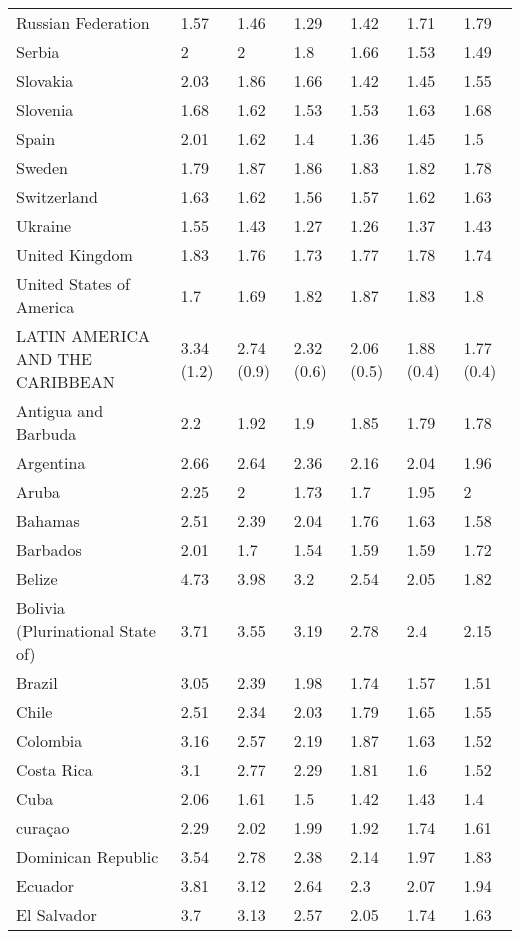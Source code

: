 \begin{longtable}[t]{lllllll}
Russian Federation & 1.57 & 1.46 & 1.29 & 1.42 & 1.71 & 1.79\\
Serbia & 2 & 2 & 1.8 & 1.66 & 1.53 & 1.49\\
Slovakia & 2.03 & 1.86 & 1.66 & 1.42 & 1.45 & 1.55\\
Slovenia & 1.68 & 1.62 & 1.53 & 1.53 & 1.63 & 1.68\\
Spain & 2.01 & 1.62 & 1.4 & 1.36 & 1.45 & 1.5\\
Sweden & 1.79 & 1.87 & 1.86 & 1.83 & 1.82 & 1.78\\
Switzerland & 1.63 & 1.62 & 1.56 & 1.57 & 1.62 & 1.63\\
Ukraine & 1.55 & 1.43 & 1.27 & 1.26 & 1.37 & 1.43\\
United Kingdom & 1.83 & 1.76 & 1.73 & 1.77 & 1.78 & 1.74\\
United States of America & 1.7 & 1.69 & 1.82 & 1.87 & 1.83 & 1.8\\
LATIN AMERICA AND THE CARIBBEAN & 3.34 (1.2) & 2.74 (0.9) & 2.32 (0.6) & 2.06 (0.5) & 1.88 (0.4) & 1.77 (0.4)\\
Antigua and Barbuda & 2.2 & 1.92 & 1.9 & 1.85 & 1.79 & 1.78\\
Argentina & 2.66 & 2.64 & 2.36 & 2.16 & 2.04 & 1.96\\
Aruba & 2.25 & 2 & 1.73 & 1.7 & 1.95 & 2\\
Bahamas & 2.51 & 2.39 & 2.04 & 1.76 & 1.63 & 1.58\\
Barbados & 2.01 & 1.7 & 1.54 & 1.59 & 1.59 & 1.72\\
Belize & 4.73 & 3.98 & 3.2 & 2.54 & 2.05 & 1.82\\
Bolivia (Plurinational State of) & 3.71 & 3.55 & 3.19 & 2.78 & 2.4 & 2.15\\
Brazil & 3.05 & 2.39 & 1.98 & 1.74 & 1.57 & 1.51\\
Chile & 2.51 & 2.34 & 2.03 & 1.79 & 1.65 & 1.55\\
Colombia & 3.16 & 2.57 & 2.19 & 1.87 & 1.63 & 1.52\\
Costa Rica & 3.1 & 2.77 & 2.29 & 1.81 & 1.6 & 1.52\\
Cuba & 2.06 & 1.61 & 1.5 & 1.42 & 1.43 & 1.4\\
curaçao & 2.29 & 2.02 & 1.99 & 1.92 & 1.74 & 1.61\\
Dominican Republic & 3.54 & 2.78 & 2.38 & 2.14 & 1.97 & 1.83\\
Ecuador & 3.81 & 3.12 & 2.64 & 2.3 & 2.07 & 1.94\\
El Salvador & 3.7 & 3.13 & 2.57 & 2.05 & 1.74 & 1.63\\

\end{longtable}
